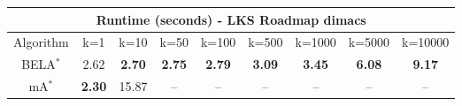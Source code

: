 \begin{tabular}{c|cccccccc}\toprule
\multicolumn{9}{c}{Runtime (seconds) - LKS Roadmap dimacs}\\ \midrule
Algorithm & k=1 & k=10 & k=50 & k=100 & k=500 & k=1000 & k=5000 & k=10000 \\ \midrule
BELA$^*$ & 2.62 & \textbf{2.70} & \textbf{2.75} & \textbf{2.79} & \textbf{3.09} & \textbf{3.45} & \textbf{6.08} & \textbf{9.17} \\
mA$^*$ & \textbf{2.30} & 15.87 & -- & -- & -- & -- & -- & -- \\ \bottomrule 
\end{tabular}
